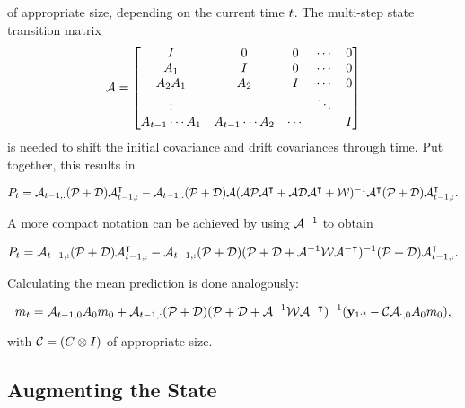 of appropriate size, depending on the current time $t$.
The multi-step state transition matrix
\begin{equation}
  \mathcal{A} = \begin{bmatrix}
    I & 0 & 0 & \cdots & 0 \\
    A_1 & I & 0 &  \cdots & 0 \\
    A_2 A_1  & A_2 & I &  \cdots & 0 \\
    \vdots & & & \ddots & \\
    A_{t-1} \cdots A_1 & A_{t-1} \cdots A_2 & \cdots & & I \\
    \end{bmatrix}
\end{equation}
is needed to shift the initial covariance and drift covariances through
time. Put together, this results in
\begin{fullwidth}\vspace{-\baselineskip}
\begin{equation}
  P_t = \mathcal{A}_{t-1,:}(\mathcal{P} + \mathcal{D})\mathcal{A}_{t-1,:}^{\intercal} - \mathcal{A}_{t-1,:}(\mathcal{P} + \mathcal{D})\mathcal{A}
(\mathcal{A}\mathcal{P}\mathcal{A}^{\intercal}
  + \mathcal{A}\mathcal{D}\mathcal{A}^{\intercal} + \mathcal{W})^{-1} \mathcal{A}^{\intercal} (\mathcal{P} + \mathcal{D}) \mathcal{A}_{t-1,:}^{\intercal}.
\end{equation}
\end{fullwidth}
A more compact notation can be achieved by using $\mathcal{A}^{-1}$ to obtain
\begin{fullwidth}\vspace{-\baselineskip}
\begin{equation}
  \label{eq:cov-prediction}
  P_\tk = \cF_{\tk-1,:}(\cP + \cQ)\cF_{\tk-1,:}\T - \cF_{\tk-1,:}(\cP +
  \cQ)(\cP + \cQ + \cF\inv\cR\cF^{-\intercal})\inv (\cP + \cQ) \cF_{\tk-1,:}\T.
\end{equation}
\end{fullwidth}
Calculating the mean prediction is done analogously:
\begin{fullwidth}\vspace{-\baselineskip}
\begin{equation}
  \label{eq:mean-prediction}
  m_\tk = \cF_{\tk-1,0} A_0 m_0 + \cF_{\tk-1,:}(\cP + \cQ)(\cP + \cQ +
  \cF\inv\cR\cF^{-\intercal})\inv (\mathbf{y}_{1:t} - \cC\cF_{:,0} A_0 m_0),
\end{equation}
\end{fullwidth}
with $\mathcal{C} = (C\otimes I)$ of appropriate size.

\subsection{Augmenting the State}

